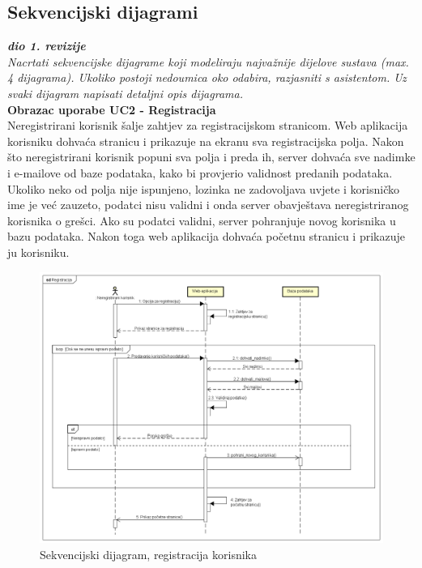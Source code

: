 			\subsection{Sekvencijski dijagrami}
				
				\textbf{\textit{dio 1. revizije}}\\
				
				\textit{Nacrtati sekvencijske dijagrame koji modeliraju najvažnije dijelove sustava (max. 4 dijagrama). Ukoliko postoji nedoumica oko odabira, razjasniti s asistentom. Uz svaki dijagram napisati detaljni opis dijagrama.}\\
				
				
				
				\textbf{Obrazac uporabe UC2 - Registracija}\\
				
				Neregistrirani korisnik šalje zahtjev za registracijskom stranicom. Web aplikacija korisniku dohvaća stranicu i prikazuje na ekranu sva registracijska polja. Nakon što neregistrirani korisnik popuni sva polja i preda ih, server dohvaća sve nadimke i e-mailove od baze podataka, kako bi provjerio validnost predanih podataka. Ukoliko neko od polja nije ispunjeno, lozinka ne zadovoljava uvjete i korisničko ime je već zauzeto, podatci nisu validni i onda server obavještava neregistriranog korisnika o grešci. Ako su podatci validni, server pohranjuje novog korisnika u bazu podataka. Nakon toga web aplikacija dohvaća početnu stranicu i prikazuje ju korisniku.
				
				\begin{figure}[H]
					\includegraphics[width=\textwidth]{dijagrami/SeqDiagram1.PNG} 
					\caption{Sekvencijski dijagram, registracija korisnika}
					\label{fig:SeqDiagram1}
				\end{figure}
				
